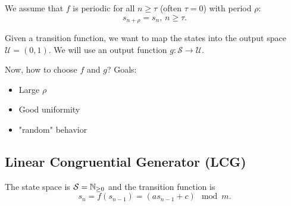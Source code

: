 We assume that $f$ is periodic for all $n \ge \tau$ (often $\tau=0$) with period $\rho$: \[
s_{n+\rho} = s_n,\,n\ge \tau
.\] 

Given a transition function, we want to map the states into the output space $\mathcal{U}=(0,1)$.
We will use an output function $g: \mathcal{S} \longrightarrow \mathcal{U}$.

Now, how to choose $f$ and $g$?
Goals:
\begin{itemize}
    \item Large $\rho$ 
    \item Good uniformity
    \item "random" behavior
\end{itemize}

\subsection*{Linear Congruential Generator (LCG)}

The state space is $\mathcal{S}=\mathbb{N}_{\ge 0}$ and the transition function is \[
s_n = f(s_{n-1}) = (a s_{n-1} + c ) \mod m
.\] 

